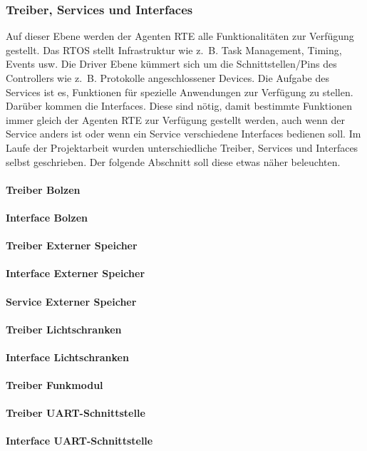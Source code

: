 
\subsubsection{Treiber, Services und Interfaces}
Auf dieser Ebene werden der Agenten RTE alle Funktionalitäten zur Verfügung gestellt. Das RTOS stellt Infrastruktur wie z.~B. Task Management, Timing, Events usw.
Die Driver Ebene kümmert sich um die Schnittstellen/Pins des Controllers wie z.~B. Protokolle angeschlossener
Devices\cite[S. 26]{Stasch:Hahn}. Die Aufgabe des Services ist es, Funktionen für spezielle Anwendungen zur Verfügung zu stellen.
Darüber kommen die Interfaces. Diese sind nötig, damit bestimmte Funktionen immer gleich der Agenten RTE zur Verfügung gestellt werden, auch wenn der Service anders ist oder wenn ein Service verschiedene Interfaces bedienen soll\cite[S. 26]{Stasch:Hahn}. Im Laufe der Projektarbeit wurden unterschiedliche Treiber, Services und Interfaces selbst geschrieben. Der folgende Abschnitt soll diese etwas näher beleuchten.

\paragraph{Treiber Bolzen}

\paragraph{Interface Bolzen}

\paragraph{Treiber Externer Speicher}

\paragraph{Interface Externer Speicher}

\paragraph{Service Externer Speicher}

\paragraph{Treiber Lichtschranken}

\paragraph{Interface Lichtschranken}

\paragraph{Treiber Funkmodul}

\paragraph{Treiber UART-Schnittstelle}

\paragraph{Interface UART-Schnittstelle}

